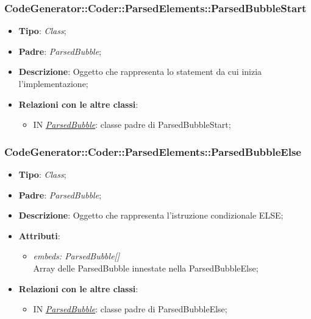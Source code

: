 \documentclass[../DefinizioneDiProdotto.tex]{subfiles}
\begin{document}
		\subsubsection{CodeGenerator::Coder::ParsedElements::ParsedBubbleStart}
		\hypertarget{SWEDesigner::Server::CodeGenerator::Coder::ParsedElements::ParsedBubbleStart}{}
		\begin{itemize}
			\item \textbf{Tipo}: \emph{Class};
			\item \textbf{Padre}: \emph{ParsedBubble};
			\item \textbf{Descrizione}: Oggetto che rappresenta lo statement da cui inizia l'implementazione;
			\item \textbf{Relazioni con le altre classi}:	
			\begin{itemize}
				\item IN \hyperlink{SWEDesigner::Server::CodeGenerator::Coder::ParsedElements::ParsedBubble}{\emph{ParsedBubble}}: classe padre di ParsedBubbleStart; 
			\end{itemize}
		\end{itemize}
	
		\subsubsection{CodeGenerator::Coder::ParsedElements::ParsedBubbleElse}
		\hypertarget{SWEDesigner::Server::CodeGenerator::Coder::ParsedElements::ParsedBubbleElse}{}
		\begin{itemize}
			\item \textbf{Tipo}: \emph{Class};
			\item \textbf{Padre}: \emph{ParsedBubble};
			\item \textbf{Descrizione}: Oggetto che rappresenta l'istruzione condizionale ELSE;
			\item \textbf{Attributi}:
			\begin{itemize}
				\item \emph{embeds: ParsedBubble[]} \\
				Array delle ParsedBubble innestate nella ParsedBubbleElse;
			\end{itemize}
			\item \textbf{Relazioni con le altre classi}:	
			\begin{itemize}
				\item IN \hyperlink{SWEDesigner::Server::CodeGenerator::Coder::ParsedElements::ParsedBubble}{\emph{ParsedBubble}}: classe padre di ParsedBubbleElse; 
			\end{itemize}
		\end{itemize}
			
\end{document}
